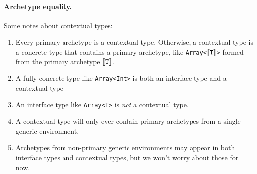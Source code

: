 \documentclass[../generics]{subfiles}
\begin{document}
\paragraph{Archetype equality.} Some notes about contextual types:
\begin{enumerate}
\item Every primary archetype is a contextual type. Otherwise, a contextual type is a concrete type that contains a primary archetype, like \texttt{Array<$[\![\texttt{T}]\!]$>} formed from the primary archetype $[\![\texttt{T}]\!]$.
\item A fully-concrete type like \texttt{Array<Int>} is both an interface type and a contextual type.
\item An interface type like \texttt{Array<T>} is \emph{not} a contextual type.
\item A contextual type will only ever contain primary archetypes from a single generic environment.
\item Archetypes from non-primary generic environments may appear in both interface types and contextual types, but we won't worry about those for now.
\end{enumerate}
\end{document}
